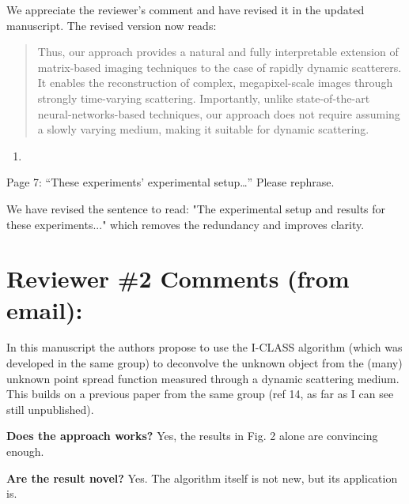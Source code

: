 \documentclass[12pt]{article}
\newenvironment{solved_reviewercomment}
    {\begin{tcolorbox}[width=\linewidth,colback=gray!5,colframe=solved_commentcolor!50,title=Reviewer Comment,left=5pt,right=5pt]}
    {\end{tcolorbox}}
\newenvironment{ourresponse}
    {\begin{tcolorbox}[width=\linewidth,breakable,enhanced,colback=gray!5,colframe=responsecolor!50,title=Response,left=5pt,right=5pt]}
    {\end{tcolorbox}}
\begin{document}
\begin{ourresponse}
    We appreciate the reviewer’s comment and have revised it in the updated manuscript. The revised version now reads:
    
    \begin{quote}
        Thus, our approach provides a natural and fully interpretable extension of matrix-based imaging techniques to the case of rapidly dynamic scatterers. It enables the reconstruction of complex, megapixel-scale images through strongly time-varying scattering. Importantly, unlike state-of-the-art neural-networks-based techniques, our approach does not require assuming a slowly varying medium, making it suitable for dynamic scattering.
    \end{quote}
    
\end{ourresponse}



\begin{enumerate}[label=\arabic*., resume]
\item \leavevmode
\end{enumerate}
\vspace{-1em}
\begin{solved_reviewercomment}
    Page 7: “These experiments’ experimental setup…” Please rephrase.
\end{solved_reviewercomment}

\begin{ourresponse}
    We have revised the sentence to read: "The experimental setup and results for these experiments..." which removes the redundancy and improves clarity.
\end{ourresponse}


\newpage

\section{Reviewer \#2 Comments (from email):}

In this manuscript the authors propose to use the I-CLASS algorithm (which was developed in the same group) to deconvolve the unknown object from the (many) unknown point spread function measured through a dynamic scattering medium. This builds on a previous paper from the same group (ref 14, as far as I can see still unpublished).

\textbf{Does the approach works?} Yes, the results in Fig. 2 alone are convincing enough.

\textbf{Are the result novel?} Yes. The algorithm itself is not new, but its application is.
\end{document}
